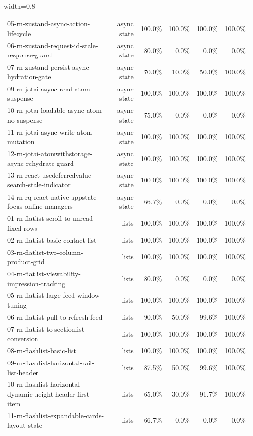 \begin{table}[htbp]
\begin{adjustbox}{width=0.8\textwidth}
\begin{tabular}{lrrrrr}
05-rn-zustand-async-action-lifecycle & async state & 100.0\% & 100.0\% & 100.0\% & 100.0\% \\
06-rn-zustand-request-id-stale-response-guard & async state & 80.0\% & 0.0\% & 0.0\% & 0.0\% \\
07-rn-zustand-persist-async-hydration-gate & async state & 70.0\% & 10.0\% & 50.0\% & 100.0\% \\
09-rn-jotai-async-read-atom-suspense & async state & 100.0\% & 100.0\% & 100.0\% & 100.0\% \\
10-rn-jotai-loadable-async-atom-no-suspense & async state & 75.0\% & 0.0\% & 0.0\% & 0.0\% \\
11-rn-jotai-async-write-atom-mutation & async state & 100.0\% & 100.0\% & 100.0\% & 100.0\% \\
12-rn-jotai-atomwithstorage-async-rehydrate-guard & async state & 100.0\% & 100.0\% & 100.0\% & 100.0\% \\
13-rn-react-usedeferredvalue-search-stale-indicator & async state & 100.0\% & 100.0\% & 100.0\% & 100.0\% \\
14-rn-rq-react-native-appstate-focus-online-managers & async state & 66.7\% & 0.0\% & 0.0\% & 0.0\% \\
01-rn-flatlist-scroll-to-unread-fixed-rows & lists & 100.0\% & 100.0\% & 100.0\% & 100.0\% \\
02-rn-flatlist-basic-contact-list & lists & 100.0\% & 100.0\% & 100.0\% & 100.0\% \\
03-rn-flatlist-two-column-product-grid & lists & 100.0\% & 100.0\% & 100.0\% & 100.0\% \\
04-rn-flatlist-viewability-impression-tracking & lists & 80.0\% & 0.0\% & 0.0\% & 0.0\% \\
05-rn-flatlist-large-feed-window-tuning & lists & 100.0\% & 100.0\% & 100.0\% & 100.0\% \\
06-rn-flatlist-pull-to-refresh-feed & lists & 90.0\% & 50.0\% & 99.6\% & 100.0\% \\
07-rn-flatlist-to-sectionlist-conversion & lists & 100.0\% & 100.0\% & 100.0\% & 100.0\% \\
08-rn-flashlist-basic-list & lists & 100.0\% & 100.0\% & 100.0\% & 100.0\% \\
09-rn-flashlist-horizontal-rail-list-header & lists & 87.5\% & 50.0\% & 99.6\% & 100.0\% \\
10-rn-flashlist-horizontal-dynamic-height-header-first-item & lists & 65.0\% & 30.0\% & 91.7\% & 100.0\% \\
11-rn-flashlist-expandable-cards-layout-state & lists & 66.7\% & 0.0\% & 0.0\% & 0.0\% \\

\end{tabular}
\end{adjustbox}
\end{table}
